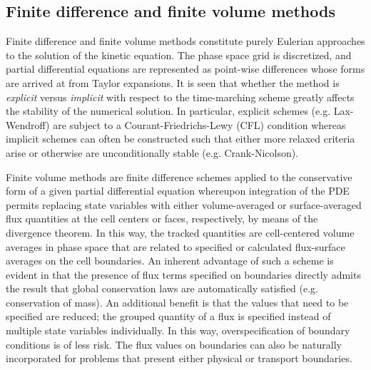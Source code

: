 \documentclass[11pt,titlepage]{report}
\begin{document}




\subsection*{Finite difference and finite volume methods}\label{FD_and_FV_methods}

\indent\indent Finite difference and finite volume methods constitute purely Eulerian approaches to the solution of the kinetic equation. The phase space grid is discretized, and partial differential equations are represented as point-wise differences whose forms are arrived at from Taylor expansions. It is seen that whether the method is \emph{explicit} versus \emph{implicit} with respect to the time-marching scheme greatly affects the stability of the numerical solution. In particular, explicit schemes (e.g. Lax-Wendroff) are subject to a Courant-Friedrichs-Lewy (CFL) condition whereas implicit schemes can often be constructed such that either more relaxed criteria arise or otherwise are unconditionally stable (e.g. Crank-Nicolson).

Finite volume methods are finite difference schemes applied to the conservative form of a given partial differential equation whereupon integration of the PDE permits replacing state variables with either volume-averaged or surface-averaged flux quantities at the cell centers or faces, respectively, by means of the divergence theorem. In this way, the tracked quantities are cell-centered volume averages in phase space that are related to specified or calculated flux-surface averages on the cell boundaries. An inherent advantage of such a scheme is evident in that the presence of flux terms specified on boundaries directly admits the result that global conservation laws are automatically satisfied (e.g. conservation of mass). An additional benefit is that the values that need to be specified are reduced; the grouped quantity of a flux is specified instead of multiple state variables individually. In this way, overspecification of boundary conditions is of less risk. The flux values on boundaries can also be naturally incorporated for problems that present either physical or transport boundaries.
\end{document}
